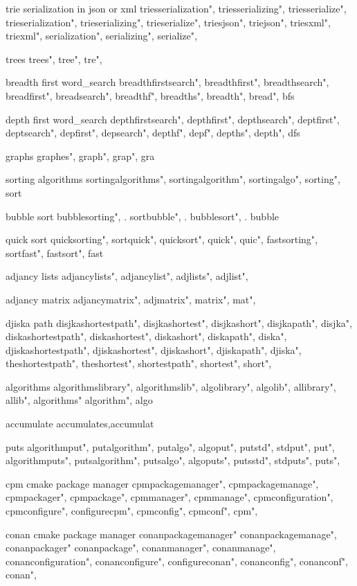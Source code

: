          trie serialization in json or xml 
        triesserialization",  triesserializing",  triesserialize",  trieserialization",  trieserializing",  trieserialize",  triesjson",  triejson",  triesxml",  triexml",  serialization",  serializing",  serialize",  
        
         trees 
        trees", tree", tre",
        
         breadth first word_search 
        breadthfirstsearch",  breadthfirst",  breadthsearch",  breadfirst",  breadsearch",  breadthf",  breadths",  breadth",  bread",  bfs
        
         depth first word_search 
        depthfirstsearch",  depthfirst",  depthsearch",  deptfirst",  deptsearch",  depfirst",  depsearch",  depthf",  depf",  depths",  depth",  dfs
        
         graphs 
        graphes", graph", grap", gra
        
         sorting algorithms 
        sortingalgorithms",  sortingalgorithm",  sortingalgo",  sorting",  sort
        
         bubble sort 
        bubblesorting", . sortbubble", . bubblesort", . bubble
        
         quick sort 
        quicksorting",  sortquick",  quicksort",  quick",  quic",  fastsorting",  sortfast",  fastsort",  fast
        
         adjancy lists
        adjancylists",  adjancylist",  adjlists",  adjlist",  
        
         adjancy matrix 
        adjancymatrix",  adjmatrix",  matrix",  mat",  
        
         djiska path 
        disjkashortestpath",  disjkashortest",  disjkashort",  disjkapath",  disjka",  diskashortestpath",  diskashortest",  diskashort",  diskapath",  diska",  djiskashortestpath",  djiskashortest",  djiskashort",  djiskapath",  djiska",  theshortestpath",  theshortest",  shortestpath",  shortest",  short",  
        
         algorithms 
        algorithmslibrary", algorithmslib", algolibrary", algolib", allibrary", allib", algorithms" algorithm", algo
        
         accumulate
        accumulates,accumulat
        
         puts 
        algorithmput",  putalgorithm",  putalgo",  algoput",  putstd",  stdput",  put",  algorithmputs",  putsalgorithm",  putsalgo",  algoputs",  putsstd",  stdputs",  puts",  
        
         cpm cmake package manager
        cpmpackagemanager",  cpmpackagemanage",  cpmpackager",  cpmpackage",  cpmmanager",  cpmmanage",  cpmconfiguration",  cpmconfigure",  configurecpm",  cpmconfig",  cpmconf",  cpm",  
        
         
         conan cmake package manager
        conanpackagemanager" conanpackagemanage", conanpackager" conanpackage", conanmanager", conanmanage", conanconfiguration", conanconfigure", configureconan", conanconfig", conanconf", conan",
